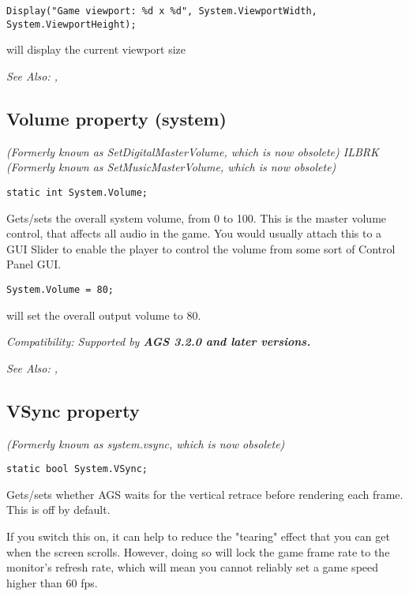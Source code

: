 \begin{verbatim}
Display("Game viewport: %d x %d", System.ViewportWidth, System.ViewportHeight);
\end{verbatim}
will display the current viewport size

\it{See Also:} ,


\subsection{Volume property (system)}\label{System.Volume}%

\it{(Formerly known as SetDigitalMasterVolume, which is now obsolete)} ILBRK
\it{(Formerly known as SetMusicMasterVolume, which is now obsolete)}

\begin{verbatim}
static int System.Volume;
\end{verbatim}
Gets/sets the overall system volume, from 0 to 100. This is the master volume control, that
affects all audio in the game. You would usually attach this to a GUI Slider to enable the
player to control the volume from some sort of Control Panel GUI.

\begin{verbatim}
System.Volume = 80;
\end{verbatim}
will set the overall output volume to 80.

\it{Compatibility:} Supported by \bf{AGS 3.2.0} and later versions.

\it{See Also:} ,


\subsection{VSync property}\label{System.VSync}%

\it{(Formerly known as system.vsync, which is now obsolete)}

\begin{verbatim}
static bool System.VSync;
\end{verbatim}
Gets/sets whether AGS waits for the vertical retrace before rendering each frame.
This is off by default.

If you switch this on, it can help to reduce the "tearing" effect that you can
get when the screen scrolls. However, doing so will lock the game frame rate to
the monitor's refresh rate, which will mean you cannot reliably set a game speed higher
than 60 fps.

